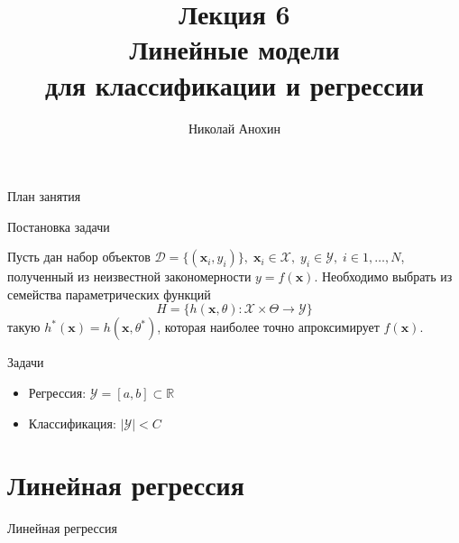 \documentclass[10pt]{beamer}
\author{Николай Анохин}
\title{\newline \newline \newline Лекция 6 \\ Линейные модели \\ для классификации и регрессии}
\let\otp\titlepage
\renewcommand{\titlepage}{\otp\addtocounter{framenumber}{-1}}
\begin{document}
\begin{frame}[plain]
\titlepage
\end{frame}

\begin{frame}{План занятия}
\tableofcontents
\end{frame}

\begin{frame}{Постановка задачи}

Пусть дан набор объектов $\mathcal{D} = \{(\mathbf{x}_i, y_i)\},
\; \mathbf{x}_i \in \mathcal{X},
\; y_i \in \mathcal{Y},
\; i \in 1, \ldots, N$, полученный из неизвестной закономерности $y = f(\mathbf{x})$. Необходимо выбрать из семейства параметрических функций
\[
H = \{h(\mathbf{x}, \theta): \mathcal{X} \times \Theta \rightarrow \mathcal{Y} \}
\]
такую $h^*(\mathbf{x}) = h(\mathbf{x}, \theta^*)$, которая наиболее точно апроксимирует $f(\mathbf{x})$.

\vspace{1em}
Задачи
\begin{itemize}
\item Регрессия: $\mathcal{Y} = [a, b] \subset \mathbb{R}$
\item Классификация: $|\mathcal{Y}| < C$
\end{itemize}

\end{frame}


\section{Линейная регрессия}


\begin{frame}{}

\begin{center}
\Large Линейная регрессия
\end{center}

\end{frame}
\end{document}
